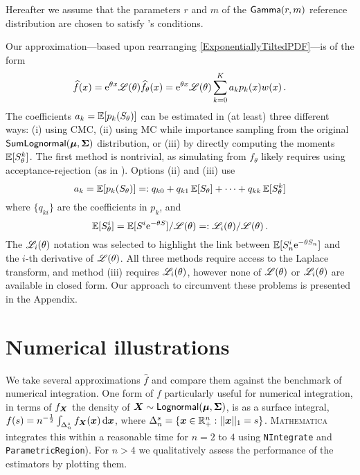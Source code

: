 Hereafter we assume that the parameters $r$ and $m$ of the $\mathsf{Gamma}(r,m)$ reference distribution are chosen to satisfy 's conditions.

Our approximation---based upon rearranging \eqref{ExponentiallyTiltedPDF}---is of the form
\begin{equation}\label{fGammaApprox}
 \widehat{f}(x) = \mathrm{e}^{\theta x} \mathscr{L}(\theta) \widehat{f}_\theta(x) = \mathrm{e}^{\theta x} \mathscr{L}(\theta) \sum_{k=0}^K a_k p_k(x) w(x) \,.
\end{equation}
The coefficients $a_k = \operatorname{{\mathbb E}} [p_k(S_\theta)]$ can be estimated in (at least) three different ways: (i) using CMC, (ii) using MC while importance sampling from the original $\mathsf{SumLognormal}(\bm{\mu}, \bm{\Sigma})$ distribution, or (iii) by directly computing the moments $\operatorname{{\mathbb E}}[S_\theta^k]$. The first method is nontrivial, as simulating from $f_\theta$ likely requires using acceptance-rejection (as in \cite{asmussen2015exponential}). Options (ii) and (iii) use
\begin{equation} \label{eq:expand_coeffs}
	a_k = \operatorname{{\mathbb E}} [p_k(S_\theta)] =: q_{k0} + q_{k1} \operatorname{{\mathbb E}}[S_\theta] + \dots + q_{kk} \operatorname{{\mathbb E}}[S_\theta^k]
\end{equation}
where $\{q_{ki}\}$ are the coefficients in $p_k$, and
\[
\operatorname{{\mathbb E}}[S_\theta^i] = \operatorname{{\mathbb E}}[S^i \mathrm{e}^{-\theta S}] / \mathscr{L}(\theta) =: \mathscr{L}_i(\theta) / \mathscr{L}(\theta) \,.
\]
The $\mathscr{L}_i(\theta)$ notation was selected to highlight the link between $\operatorname{{\mathbb E}}[S_n^i \mathrm{e}^{-\theta S_n}]$ and the $i$-th derivative of $\mathscr{L}(\theta)$. All three methods require access to the Laplace transform, and method (iii) requires $\mathscr{L}_i(\theta)$, however none of $\mathscr{L}(\theta)$ or $\mathscr{L}_i(\theta)$ are available in closed form. Our approach to circumvent these problems is presented in the Appendix.

\section{Numerical illustrations}\label{S:numerical}

We take several approximations $\widehat{f}$ and compare them against the benchmark of numerical integration.
One form of $f$ particularly useful for numerical integration, in terms of $f_{\bm{X}}$ the density of $\bm{X} \sim \mathsf{Lognormal}(\bm{\mu}, \bm{\Sigma})$, is as a surface integral,
$ f(s) = n^{-\frac12} \int_{\Delta_n^s} f_{\bm{X}}(\bm{x}) \mathop{}\!\mathrm{d} \bm{x} $,
where $\Delta_n^s = \{ \bm{x} \in \mathbb{R}_+^n : ||\bm{x}||_1 = s \}$. \textsc{Mathematica} integrates this within a reasonable time for $n=2$ to $4$ using \texttt{NIntegrate} and \texttt{ParametricRegion}). For $n > 4$ we qualitatively assess the performance of the estimators by plotting them.

